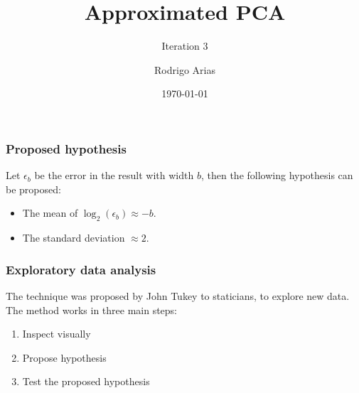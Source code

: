 \documentclass[serif, 12pt]{beamer}
\title{Approximated PCA}
\subtitle{Iteration 3}
\author{Rodrigo Arias} %
\date{\today} %
\begin{document}
\begin{frame}
	\titlepage
\end{frame}


\begin{frame}

\frametitle{Proposed hypothesis}

Let $\epsilon_b$ be the error in the result with width $b$, then the following 
hypothesis can be proposed:
\begin{itemize}
\item The mean of $\log_2(\epsilon_b) \approx -b$.
\item The standard deviation $\approx 2$.
\end{itemize}

\end{frame}




\begin{frame}
\frametitle{Exploratory data analysis}
The technique was proposed by John Tukey to staticians, to explore new data.  
The method works in three main steps:

\begin{enumerate}
\item Inspect visually
\item Propose hypothesis
\item Test the proposed hypothesis
\end{enumerate}
\end{frame}
\end{document}
